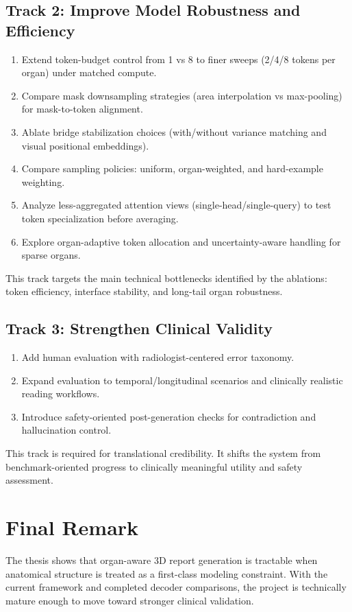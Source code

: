 \subsection{Track 2: Improve Model Robustness and Efficiency}
\begin{enumerate}
    \item Extend token-budget control from 1 vs 8 to finer sweeps (2/4/8 tokens per organ) under matched compute.
    \item Compare mask downsampling strategies (area interpolation vs max-pooling) for mask-to-token alignment.
    \item Ablate bridge stabilization choices (with/without variance matching and visual positional embeddings).
    \item Compare sampling policies: uniform, organ-weighted, and hard-example weighting.
    \item Analyze less-aggregated attention views (single-head/single-query) to test token specialization before averaging.
    \item Explore organ-adaptive token allocation and uncertainty-aware handling for sparse organs.
\end{enumerate}
This track targets the main technical bottlenecks identified by the ablations: token efficiency, interface stability, and long-tail organ robustness.

\subsection{Track 3: Strengthen Clinical Validity}
\begin{enumerate}
    \item Add human evaluation with radiologist-centered error taxonomy.
    \item Expand evaluation to temporal/longitudinal scenarios and clinically realistic reading workflows.
    \item Introduce safety-oriented post-generation checks for contradiction and hallucination control.
\end{enumerate}
This track is required for translational credibility. It shifts the system from benchmark-oriented progress to clinically meaningful utility and safety assessment.

\section{Final Remark}
The thesis shows that organ-aware 3D report generation is tractable when anatomical structure is treated as a first-class modeling constraint. With the current framework and completed decoder comparisons, the project is technically mature enough to move toward stronger clinical validation.
